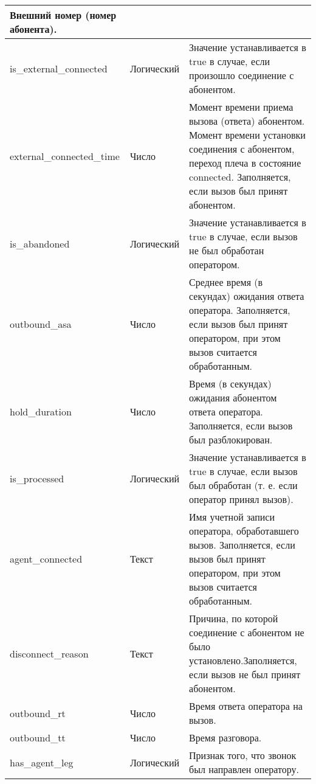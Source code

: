 \begin{small}
\begin{longtable}{|p{}|p{}|p{}|}
                Внешний номер (номер абонента).\\
\hline
        is\_external\_connected &
        Логический &
                Значение устанавливается в true в случае, если произошло соединение с абонентом.\\
\hline
        external\_connected\_time &
        Число &
                Момент времени приема вызова (ответа) абонентом. Момент времени установки соединения с абонентом, переход плеча в состояние connected. Заполняется, если вызов был принят абонентом.\\
\hline
        is\_abandoned &
        Логический &
                Значение устанавливается в true в случае, если вызов не был обработан оператором.\\
\hline
        outbound\_asa &
        Число &
                Среднее время (в секундах) ожидания ответа оператора. Заполняется, если вызов был принят оператором, при этом вызов считается обработанным.\\
\hline
        hold\_duration &
        Число &
                Время (в секундах) ожидания абонентом ответа оператора. Заполняется, если вызов был разблокирован.\\
\hline
        is\_processed &
        Логический &
                Значение устанавливается в true в случае, если вызов был обработан (т. е. если оператор принял вызов).\\
\hline
        agent\_connected &
        Текст &
                Имя учетной записи оператора, обработавшего вызов. Заполняется, если вызов был принят оператором, при этом вызов считается обработанным.\\
\hline
        disconnect\_reason &
        Текст &
                Причина, по которой соединение с абонентом не было установлено.Заполняется, если вызов не был принят абонентом.\\
\hline
        outbound\_rt &
        Число &
                Время ответа оператора на вызов.\\
\hline
        outbound\_tt &
        Число &
                Время разговора.\\
\hline
        has\_agent\_leg &
        Логический &
                Признак того, что звонок был направлен оператору. \\
    \end{longtable}
\end{small}


